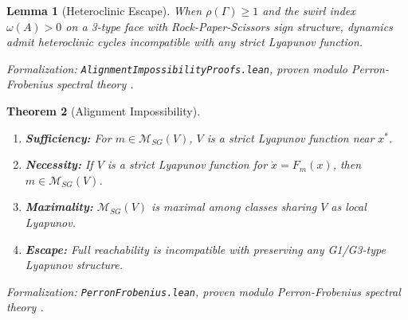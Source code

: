 \documentclass[12pt]{article}
\newtheorem{theorem}{Theorem}[section]
\newtheorem{lemma}[theorem]{Lemma}
\begin{document}
\begin{lemma}[Heteroclinic Escape]
\label{lem:heteroclinic}
When $\rho(\Gamma) \geq 1$ and the swirl index $\omega(A) > 0$ on a 3-type face with Rock-Paper-Scissors sign structure, dynamics admit heteroclinic cycles incompatible with any strict Lyapunov function.
\end{lemma}
\noindent\textit{Formalization: \texttt{AlignmentImpossibilityProofs.lean}, proven modulo Perron-Frobenius spectral theory \citep{horn2012matrix}.}

\begin{theorem}[Alignment Impossibility]
\label{thm:alignment-impossibility}
\begin{enumerate}
    \item[(a)] \textbf{Sufficiency:} For $m \in \mathcal{M}_{SG}(V)$, $V$ is a strict Lyapunov function near $x^*$.
    \item[(b)] \textbf{Necessity:} If $V$ is a strict Lyapunov function for $\dot{x} = F_m(x)$, then $m \in \mathcal{M}_{SG}(V)$.
    \item[(c)] \textbf{Maximality:} $\mathcal{M}_{SG}(V)$ is maximal among classes sharing $V$ as local Lyapunov.
    \item[(d)] \textbf{Escape:} Full reachability is incompatible with preserving any G1/G3-type Lyapunov structure.
\end{enumerate}
\end{theorem}
\noindent\textit{Formalization: \texttt{PerronFrobenius.lean}, proven modulo Perron-Frobenius spectral theory \citep{horn2012matrix}.}
\end{document}
